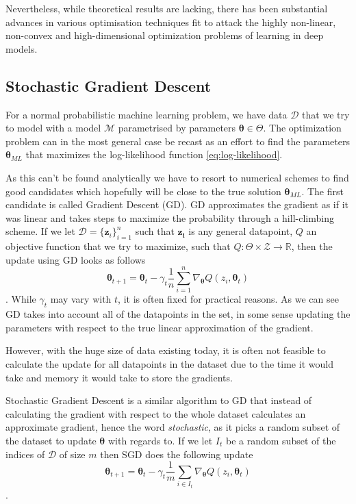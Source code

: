 Nevertheless, while theoretical results are lacking, there has been substantial
advances in various optimisation techniques fit to attack the highly non-linear,
non-convex and high-dimensional optimization problems of learning in deep models.

\subsection{Stochastic Gradient Descent}

For a normal probabilistic machine learning problem, we have data $\mathcal{D}$
that we try to model with a model $\mathcal{M}$ parametrised by parameters
$\bm{\theta} \in \Theta$. The optimization problem can in the most general case be recast
as an effort to find the parameters $\bm{\theta}_{ML}$ that maximizes the
log-likelihood function \ref{eq:log-likelihood}.

As this can't be found analytically we have to resort to numerical schemes to
find good candidates which hopefully will be close to the true solution
$\bm{\theta}_{ML}$. The first candidate is called Gradient Descent (GD).
GD approximates the gradient as if it was linear and takes steps to maximize the
probability through a hill-climbing scheme. If we let $\mathcal{D} =
\{\bm{z}_i\}_{i = 1}^n$ such that $\bm{z_i}$ is any general datapoint, $Q$ an
objective function that we try to maximize, such that $Q : \Theta \times
\mathcal{Z} \to \mathbb{R}$, then the update using GD looks as follows
\begin{equation}
  \label{eq:GD_update}
  \bm{\theta}_{t + 1} = \bm{\theta}_t - \gamma_t \frac{1}{n} \sum_{i = 1}^n \nabla_{\bm{\theta}} Q(z_i, \bm{\theta}_t)
\end{equation}.\cite{}
While $\gamma_t$ may vary with $t$, it is often fixed for practical reasons. As
we can see GD takes into account all of the datapoints in the set, in some sense
updating the parameters with respect to the true linear approximation of the gradient.

However, with the huge size of data existing today, it is often not feasible to
calculate the update for all datapoints in the dataset due to the time it would
take and memory it would take to store the gradients.

Stochastic Gradient Descent is a similar algorithm to GD that instead of
calculating the gradient with respect to the whole dataset calculates an
approximate gradient, hence the word \textit{stochastic}, as it picks a random
subset of the dataset to update $\bm{\theta}$ with regards to. If we let $I_t$
be a random subset of the indices of $\mathcal{D}$ of size $m$ then SGD does the
following update
\begin{equation}
  \label{eq:SGD_update}
  \bm{\theta}_{t + 1} = \bm{\theta}_t - \gamma_t \frac{1}{m} \sum_{i \in I_t} \nabla_{\bm{\theta}} Q(z_i, \bm{\theta}_t)
\end{equation}.

